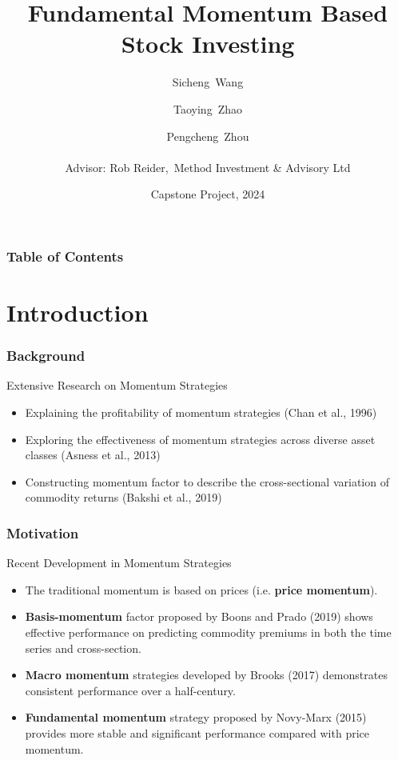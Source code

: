 \documentclass{beamer}
\title[Fundamental Momentum]{Fundamental Momentum Based Stock Investing}
\author[]{Sicheng~Wang\and Taoying~Zhao\and Pengcheng~Zhou\\~\\
Advisor: Rob Reider,~Method Investment \& Advisory Ltd}
\date{Capstone Project, 2024}
\begin{document}
    \maketitle
    \begin{frame}
        \frametitle{Table of Contents}
        \tableofcontents
    \end{frame}

\section{Introduction}
\begin{frame}
    \frametitle{Background}
    \begin{block}{Extensive Research on Momentum Strategies}
        \begin{itemize}
            \item Explaining the profitability of momentum strategies {\color{blue} (Chan et al., 1996)}
            \item Exploring the effectiveness of momentum strategies across diverse asset classes {\color{blue} (Asness et al., 2013)}
            \item Constructing momentum factor to describe the cross-sectional variation of commodity returns {\color{blue} (Bakshi et al., 2019)}
        \end{itemize}
    \end{block}
\end{frame}

\begin{frame}
    \frametitle{Motivation}
    \begin{block}{Recent Development in Momentum Strategies}
        \begin{itemize}
            \item The traditional momentum is based on prices (i.e. {\bf price momentum}).
            \item {\bf Basis-momentum} factor proposed by {\color{blue} Boons and Prado (2019)} shows effective performance on predicting commodity premiums in
            both the time series and cross-section.
            \item {\bf Macro momentum} strategies developed by {\color{blue} Brooks (2017)} demonstrates consistent performance over a half-century.
            \item {\bf Fundamental momentum} strategy proposed by {\color{blue} Novy-Marx (2015)} provides more stable and significant performance compared with price momentum.
        \end{itemize}
    \end{block}
\end{frame}
\end{document}
